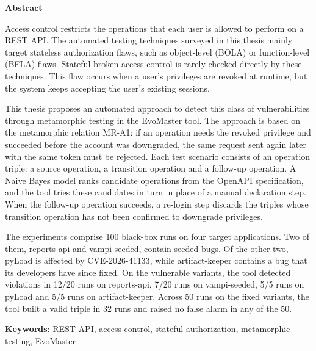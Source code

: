 \begin{center}
\textbf{\large{Abstract}}
\end{center}

\begin{small}

Access control restricts the operations that each user is allowed to perform on a REST API. The automated testing techniques surveyed in this thesis mainly target stateless authorization flaws, such as object-level (BOLA) or function-level (BFLA) flaws. Stateful broken access control is rarely checked directly by these techniques. This flaw occurs when a user's privileges are revoked at runtime, but the system keeps accepting the user's existing sessions.

This thesis proposes an automated approach to detect this class of vulnerabilities through metamorphic testing in the EvoMaster tool. The approach is based on the metamorphic relation MR-A1: if an operation needs the revoked privilege and succeeded before the account was downgraded, the same request sent again later with the same token must be rejected. Each test scenario consists of an operation triple: a source operation, a transition operation and a follow-up operation. A Naive Bayes model ranks candidate operations from the OpenAPI specification, and the tool tries these candidates in turn in place of a manual declaration step. When the follow-up operation succeeds, a re-login step discards the triples whose transition operation has not been confirmed to downgrade privileges.

The experiments comprise 100 black-box runs on four target applications. Two of them, reports-api and vampi-seeded, contain seeded bugs. Of the other two, pyLoad is affected by \mbox{CVE-2026-41133}, while artifact-keeper contains a bug that its developers have since fixed. On the vulnerable variants, the tool detected violations in 12/20 runs on reports-api, 7/20 runs on vampi-seeded, 5/5 runs on pyLoad and 5/5 runs on artifact-keeper. Across 50 runs on the fixed variants, the tool built a valid triple in 32 runs and raised no false alarm in any of the 50.

\vspace*{1cm}
{\raggedright\textbf{Keywords}: REST API, access control, stateful authorization, metamorphic testing, EvoMaster\par}
\end{small}
